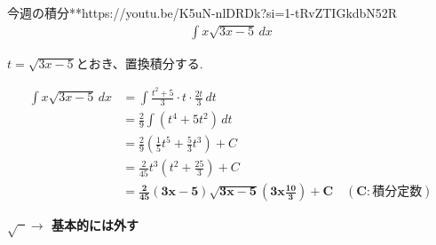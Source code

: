 \documentclass[main]{subfiles}
\begin{document}

\begin{mondai}{7}{今週の積分}{**}{https://youtu.be/K5uN-nlDRDk?si=1-tRvZTIGkdbN52R}
    \begin{align*}
        \int x\sqrt{3x-5} \, dx
    \end{align*}
\end{mondai}


\solutionhead
\hfill
$t=\sqrt{3x-5}$とおき、置換積分する.
\hfill\

\begin{align*}
    \int x\sqrt{3x-5} \, dx
        &= \int\frac{t^2+5}{3}\cdot t\cdot \frac{2t}{3} \, dt \\
        &= \frac{2}{9}\int\left(t^4+5t^2\right) \, dt \\
        &= \frac{2}{9}\left(\frac{1}{5}t^5+\frac{5}{3}t^3\right)+C \\
        &= \frac{2}{45}t^3\left(t^2+\frac{25}{3}\right)+C \\
        &= \boldsymbol{\frac{2}{45}\left(3x-5\right)\sqrt{3x-5}\left(3x\frac{10}{3}\right)+C \quad (C:\textbf{積分定数})}
\end{align*}

\begin{focusbox}
\centering
\textbf{$\sqrt{\phantom{x}}\rightarrow$  基本的には外す}
\end{focusbox}
\end{document}
